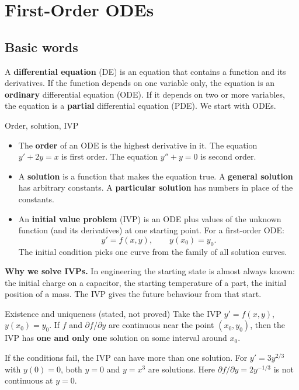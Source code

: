 \chapter{First-Order ODEs}

\section{Basic words}

A \textbf{differential equation} (DE) is an equation that contains a function and its derivatives. If the function depends on one variable only, the equation is an \textbf{ordinary} differential equation (ODE). If it depends on two or more variables, the equation is a \textbf{partial} differential equation (PDE). We start with ODEs.

\begin{defbox}{Order, solution, IVP}
\begin{itemize}
  \item The \textbf{order} of an ODE is the highest derivative in it. The equation $y' + 2y = x$ is first order. The equation $y'' + y = 0$ is second order.
  \item A \textbf{solution} is a function that makes the equation true. A \textbf{general solution} has arbitrary constants. A \textbf{particular solution} has numbers in place of the constants.
  \item An \textbf{initial value problem} (IVP) is an ODE plus values of the unknown function (and its derivatives) at one starting point. For a first-order ODE:
  \[ y' = f(x,y), \qquad y(x_0) = y_0 . \]
  The initial condition picks one curve from the family of all solution curves.
\end{itemize}
\end{defbox}

\textbf{Why we solve IVPs.} In engineering the starting state is almost always known: the initial charge on a capacitor, the starting temperature of a part, the initial position of a mass. The IVP gives the future behaviour from that start.

\begin{defbox}{Existence and uniqueness (stated, not proved)}
Take the IVP $y' = f(x,y)$, $y(x_0)=y_0$. If $f$ and $\partial f/\partial y$ are continuous near the point $(x_0,y_0)$, then the IVP has \textbf{one and only one} solution on some interval around $x_0$.
\end{defbox}

\begin{notebox}
If the conditions fail, the IVP can have more than one solution. For $y' = 3y^{2/3}$ with $y(0)=0$, both $y=0$ and $y=x^3$ are solutions. Here $\partial f/\partial y = 2y^{-1/3}$ is not continuous at $y=0$.
\end{notebox}

